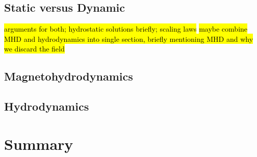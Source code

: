 \subsection{Static versus Dynamic}
\hl{arguments for both; hydrostatic solutions briefly; scaling laws}
\hl{maybe combine MHD and hydrodynamics into single section, briefly mentioning MHD and why we discard the field}
\subsection{Magnetohydrodynamics}
\subsection{Hydrodynamics}
\section{Summary}

